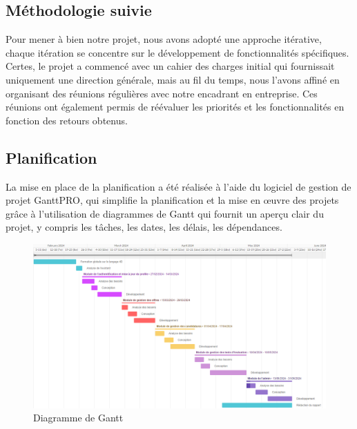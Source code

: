 \subsection{Méthodologie suivie}
Pour mener à bien notre projet, nous avons adopté une approche itérative, chaque itération se concentre sur le développement de 
fonctionnalités spécifiques. Certes, le projet a commencé avec un cahier des charges initial qui fournissait uniquement une direction 
générale, mais au fil du temps, nous l'avons affiné en organisant des réunions régulières avec notre encadrant en entreprise. Ces réunions 
ont également permis de réévaluer les priorités et les fonctionnalités en fonction des retours obtenus.

\subsection{Planification}
La mise en place de la planification a été réalisée à l’aide du logiciel de gestion de
projet GanttPRO, qui simplifie la planification et la mise en œuvre des projets grâce à
l’utilisation de diagrammes de Gantt qui fournit un aperçu clair du projet, y compris les
tâches, les dates, les délais, les dépendances.

\begin{figure}[h]
    \centering
    \includegraphics[scale=0.6]{diag/Gantt.png} %
    \caption{Diagramme de Gantt}
    \label{fig:gantt}
\end{figure}

